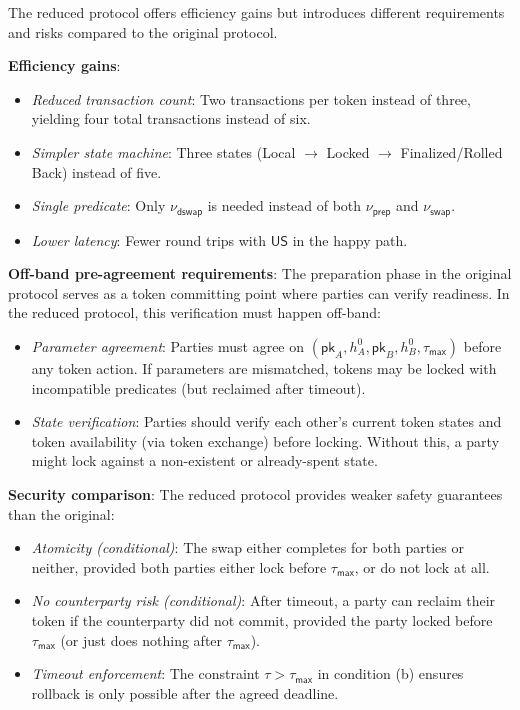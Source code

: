 \documentclass{article}
\newcommand{\pubkey}[0]{\mathsf{pk}}
\newcommand{\unisrv}[0]{\mathsf{US}}
\begin{document}
The reduced protocol offers efficiency gains but introduces different requirements and risks compared to the original protocol.\medskip

\noindent\textbf{Efficiency gains}:
\begin{itemize}
\item \emph{Reduced transaction count}: Two transactions per token instead of three, yielding four total transactions instead of six.
\item \emph{Simpler state machine}: Three states (Local $\to$ Locked $\to$ Finalized/Rolled Back) instead of five.
\item \emph{Single predicate}: Only $\nu_\mathsf{dswap}$ is needed instead of both $\nu_\mathsf{prep}$ and $\nu_\mathsf{swap}$.
\item \emph{Lower latency}: Fewer round trips with $\unisrv$ in the happy path.
\end{itemize}
\medskip

\noindent\textbf{Off-band pre-agreement requirements}: The preparation phase in the original protocol serves as a token committing point where parties can verify readiness. In the reduced protocol, this verification must happen off-band:
\begin{itemize}
\item \emph{Parameter agreement}: Parties must agree on $(\pubkey_A, h^0_A, \pubkey_B, h^0_B, \tau_\mathsf{max})$ before any token action. If parameters are mismatched, tokens may be locked with incompatible predicates (but reclaimed after timeout).
\item \emph{State verification}: Parties should verify each other's current token states and token availability (via token exchange) before locking. Without this, a party might lock against a non-existent or already-spent state.
\end{itemize}
\medskip

\noindent\textbf{Security comparison}: The reduced protocol provides weaker safety guarantees than the original:
\begin{itemize}
\item \emph{Atomicity (conditional)}: The swap either completes for both parties or neither, provided both parties either lock before $\tau_\mathsf{max}$, or do not lock at all.
\item \emph{No counterparty risk (conditional)}: After timeout, a party can reclaim their token if the counterparty did not commit, provided the party locked before $\tau_\mathsf{max}$ (or just does nothing after $\tau_\mathsf{max}$).
\item \emph{Timeout enforcement}: The constraint $\tau > \tau_\mathsf{max}$ in condition (b) ensures rollback is only possible after the agreed deadline.
\end{itemize}
\end{document}
